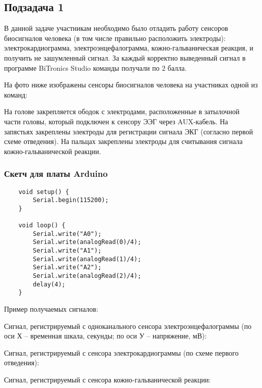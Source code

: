 \solutionSection

\subsection*{Подзадача 1}

В данной задаче участникам необходимо было отладить работу сенсоров биосигналов человека (в том числе правильно расположить электроды): электрокардиограмма, электроэнцефалограмма, кожно-гальваническая реакция, и получить не зашумленный сигнал. За каждый корректно выведенный сигнал в программе BiTronics Studio команды получали по 2 балла.

На фото ниже изображены сенсоры биосигналов человека на участниках одной из команд:


На голове закрепляется ободок с электродами, расположенные в затылочной части головы, который подключен к сенсору ЭЭГ через AUX-кабель. На запястьях закреплены электроды для регистрации сигнала ЭКГ (согласно первой схеме отведения). На пальцах закреплены электроды для считывания сигнала кожно-гальванической реакции.

\subsubsection*{Скетч для платы Arduino}

\begin{verbatim}
    void setup() {
        Serial.begin(115200);
    }

    void loop() {
        Serial.write("A0");
        Serial.write(analogRead(0)/4);
        Serial.write("A1");
        Serial.write(analogRead(1)/4);
        Serial.write("A2");
        Serial.write(analogRead(2)/4);
        delay(4);
    }
\end{verbatim}

Пример получаемых сигналов:

Сигнал, регистрируемый с одноканального сенсора электроэнцефалограммы (по оси Х – временная шкала, секунды; по оси У – напряжение, мВ):


Сигнал, регистрируемый с сенсора электрокардиограммы (по схеме первого отведения):


Сигнал, регистрируемый с сенсора кожно-гальванической реакции:


